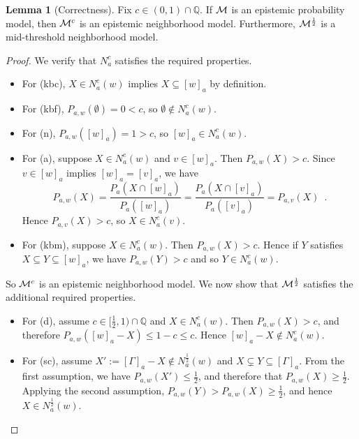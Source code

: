 \documentclass[12pt]{article}
\theoremstyle{definition}
\newtheorem{lemma}[theorem]{Lemma}
\newcommand{\Rat}{\mathbb{Q}}  %
\newcommand{\M}{{\cal M}}      %
\begin{document}
\begin{lemma}[Correctness]
  \label{lemma:correctness}
  Fix $c\in(0,1)\cap\Rat$.  If $\M$ is an epistemic probability model,
  then $\M^c$ is an epistemic neighborhood model.  Furthermore,
  $\M^{\frac 12}$ is a mid-threshold neighborhood model.
\end{lemma}
\begin{proof}
  We verify that $N^c_a$ satisfies the required properties.
  \begin{itemize}
  \item For (kbc), $X\in N^c_a(w)$ implies $X\subseteq[w]_a$ by
    definition.

  \item For (kbf), $P_{a,w}(\emptyset)=0<c$, so $\emptyset\notin N^c_a(w)$.

  \item For (n), $P_{a,w}([w]_a) = 1 > c$, so
    $[w]_a \in N^c_a(w)$.

  \item For (a), suppose $X \in N^c_a(w)$ and $v\in [w]_a$.  Then
    $P_{a,w}(X)>c$.  Since $v\in [w]_a$ implies $[w]_a = [v]_a$, we
    have
    \[
    P_{a,w}(X) = 
    \frac{P_a(X\cap[w]_a)}{P_a([w]_a)} =
    \frac{P_a(X\cap[v]_a)}{P_a([v]_a)} =
    P_{a,v}(X) \enspace.
    \]
    Hence $P_{a,v}(X)>c$, so $X \in N^c_a(v)$.

  \item For (kbm), suppose $X \in N^c_a(w)$.  Then $P_{a,w}(X)>c$.
    Hence if $Y$ satisfies $X \subseteq Y \subseteq [w]_a$, we have
    $P_{a,w}(Y)>c$ and so $Y \in N^c_a(w)$.
  \end{itemize}
  So $\M^c$ is an epistemic neighborhood model.  We now show that
  $\M^{\frac 12}$ satisfies the additional required properties.
  \begin{itemize}
  \item For (d), assume $c\in[\frac 12,1)\cap\Rat$ and $X \in
    N^c_a(w)$.  Then $P_{a,w}(X) > c$, and therefore $P_{a,w}([w]_a -
    X) \leq 1-c\leq c$. Hence $[w]_a - X \notin N^c_a(w)$.

  \item For (sc), assume $X':=[\Gamma]_a-X\notin N^{\frac 12}_a(w)$
    and $X\subsetneq Y\subseteq[\Gamma]_a$.  From the first
    assumption, we have $P_{a,w}(X') \leq \frac 12$, and therefore
    that $P_{a,w}(X)\geq \frac 12$.  Applying the second assumption,
    $P_{a,w}(Y) > P_{a,w}(X)\geq \frac 12$, and hence $X\in N^{\frac
      12}_a(w)$.


\end{itemize}
\end{proof}
\end{document}
